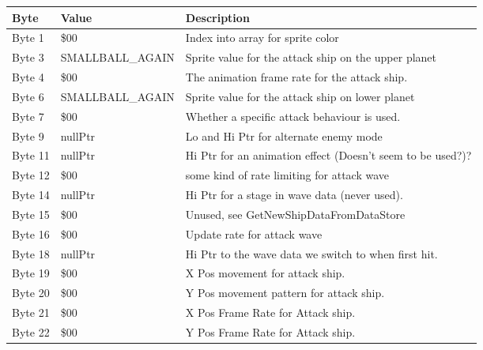 \begin{figure}[H]
{\begin{adjustbox}{width=12cm}
\begin{tabular}{lll}
\toprule
 Byte    & Value                      & Description                                                        \\
\midrule
 Byte 1  & \$00                        & Index into array for sprite color                                  \\
 Byte 3  & SMALLBALL\_AGAIN            & Sprite value for the attack ship on the upper planet               \\
 Byte 4  & \$00                        & The animation frame rate for the attack ship.                      \\
 Byte 6  & SMALLBALL\_AGAIN            & Sprite value for the attack ship on lower planet                   \\
 Byte 7  & \$00                        & Whether a specific attack behaviour is used.                       \\
 Byte 9  & nullPtr                    & Lo and Hi Ptr for alternate enemy mode                             \\
 Byte 11 & nullPtr                    & Hi Ptr for an animation effect (Doesn't seem to be used?)?         \\
 Byte 12 & \$00                        & some kind of rate limiting for attack wave                         \\
 Byte 14 & nullPtr                    & Hi Ptr for a stage in wave data (never used).                      \\
 Byte 15 & \$00                        & Unused, see GetNewShipDataFromDataStore                            \\
 Byte 16 & \$00                        & Update rate for attack wave                                        \\
 Byte 18 & nullPtr                    & Hi Ptr to the wave data we switch to when first hit.               \\
 Byte 19 & \$00                        & X Pos movement for attack ship.                                    \\
 Byte 20 & \$00                        & Y Pos movement pattern for attack ship.                            \\
 Byte 21 & \$00                        & X Pos Frame Rate for Attack ship.                                  \\
 Byte 22 & \$00                        & Y Pos Frame Rate for Attack ship.                                  \\

\end{tabular}
\end{adjustbox}}
\end{figure}

